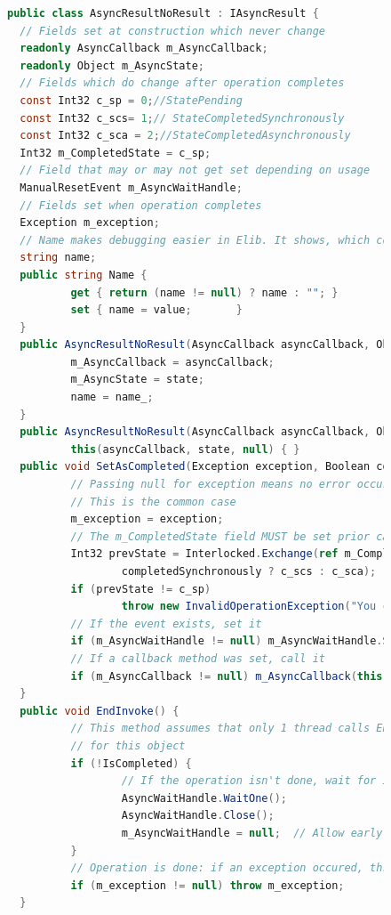 \begin{figure}[!hbp]	
\begin{lstlisting}[language=cs]
public class AsyncResultNoResult : IAsyncResult {
  // Fields set at construction which never change 
  readonly AsyncCallback m_AsyncCallback;
  readonly Object m_AsyncState;
  // Fields which do change after operation completes
  const Int32 c_sp = 0;//StatePending
  const Int32 c_scs= 1;// StateCompletedSynchronously
  const Int32 c_sca = 2;//StateCompletedAsynchronously
  Int32 m_CompletedState = c_sp;
  // Field that may or may not get set depending on usage
  ManualResetEvent m_AsyncWaitHandle;
  // Fields set when operation completes
  Exception m_exception;
  // Name makes debugging easier in Elib. It shows, which command was used.
  string name;
  public string Name { 
          get { return (name != null) ? name : ""; } 
          set { name = value; 		} 
  }
  public AsyncResultNoResult(AsyncCallback asyncCallback, Object state, string name_) {
          m_AsyncCallback = asyncCallback;
          m_AsyncState = state;
          name = name_;
  }
  public AsyncResultNoResult(AsyncCallback asyncCallback, Object state) : 
          this(asyncCallback, state, null) { }
  public void SetAsCompleted(Exception exception, Boolean completedSynchronously) {
          // Passing null for exception means no error occurred. 
          // This is the common case
          m_exception = exception;
          // The m_CompletedState field MUST be set prior calling the callback
          Int32 prevState = Interlocked.Exchange(ref m_CompletedState, 
                  completedSynchronously ? c_scs : c_sca);
          if (prevState != c_sp)
                  throw new InvalidOperationException("You can set a result only once");
          // If the event exists, set it
          if (m_AsyncWaitHandle != null) m_AsyncWaitHandle.Set();
          // If a callback method was set, call it
          if (m_AsyncCallback != null) m_AsyncCallback(this);
  }
  public void EndInvoke() {
          // This method assumes that only 1 thread calls EndInvoke 
          // for this object
          if (!IsCompleted) {
                  // If the operation isn't done, wait for it
                  AsyncWaitHandle.WaitOne();
                  AsyncWaitHandle.Close();
                  m_AsyncWaitHandle = null;  // Allow early GC
          }      
          // Operation is done: if an exception occured, throw it
          if (m_exception != null) throw m_exception;
  }


\end{lstlisting}
\end{figure}
